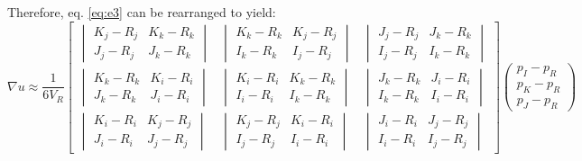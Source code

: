 \documentclass{article}
\begin{document}
Therefore, eq. \ref{eq:e3} can be rearranged to yield:
	\begin{equation} \label{eq:e4} 
		\nabla u \approx \frac{1}{6V_{R}}
		\begin{bmatrix}
			\begin{vmatrix}
				K_{j} - R_{j} & K_{k} - R_{k} \\
				J_{j} - R_{j} & J_{k} - R_{k}
			\end{vmatrix} &
			\begin{vmatrix}
				K_{k} - R_{k} & K_{j} - R_{j} \\
				I_{k} - R_{k} & I_{j} - R_{j}
			\end{vmatrix} &
			\begin{vmatrix}
				J_{j} - R_{j} & J_{k} - R_{k} \\
				I_{j} - R_{j} & I_{k} - R_{k}
			\end{vmatrix}
		\\
			\begin{vmatrix}
				K_{k} - R_{k} & K_{i} - R_{i}  \\
				J_{k} - R_{k} & J_{i} - R_{i}
			\end{vmatrix} &
			\begin{vmatrix}
				K_{i} - R_{i} & K_{k} - R_{k}  \\
				I_{i} - R_{i} & I_{k} - R_{k}
			\end{vmatrix} &
			\begin{vmatrix}
				J_{k} - R_{k} & J_{i} - R_{i}  \\
				I_{k} - R_{k} & I_{i} - R_{i} 
			\end{vmatrix}
		\\
			\begin{vmatrix}
				K_{i} - R_{i} & K_{j} - R_{j}  \\
			    J_{i} - R_{i} & J_{j} - R_{j}
			\end{vmatrix} &
			\begin{vmatrix}
				K_{j} - R_{j} & K_{i} - R_{i} \\
				I_{j} - R_{j} & I_{i} - R_{i}
			\end{vmatrix} &
			\begin{vmatrix}
				J_{i} - R_{i} & J_{j} - R_{j} \\
				I_{i} - R_{i} & I_{j} - R_{j} 
			\end{vmatrix}
		\end{bmatrix}
		\begin{pmatrix}
				p_{I} - p_{R} \\ p_{K} - p_{R}  \\ p_{J} - p_{R}
			\end{pmatrix}
	\end{equation}
\end{document}
